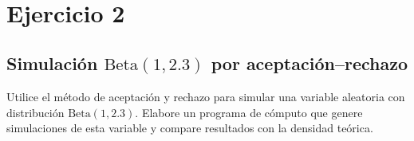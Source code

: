 \documentclass[10pt,a4paper]{article}
\let\oldsection\section
\renewcommand{\section}{%
      \clearpage
      \thispagestyle{myfancy}%
      \oldsection
    }
\begin{document}
    \begin{center}
    \end{center}
    { \hspace*{\fill} \\}
    
    \hypertarget{ejercicio-2}{%
\section{Ejercicio 2}\label{ejercicio-2}}

    \hypertarget{simulaciuxf3n-textbeta1-2.3-por-aceptaciuxf3nrechazo}{%
\subsection{\texorpdfstring{Simulación \(\text{Beta}(1, 2.3)\) por
aceptación--rechazo}{Simulación \textbackslash text\{Beta\}(1, 2.3) por aceptación--rechazo}}\label{simulaciuxf3n-textbeta1-2.3-por-aceptaciuxf3nrechazo}}

    Utilice el método de aceptación y rechazo para simular una variable
aleatoria con distribución \(\text{Beta}(1, 2.3)\). Elabore un programa
de cómputo que genere simulaciones de esta variable y compare resultados
con la densidad teórica.
\end{document}
